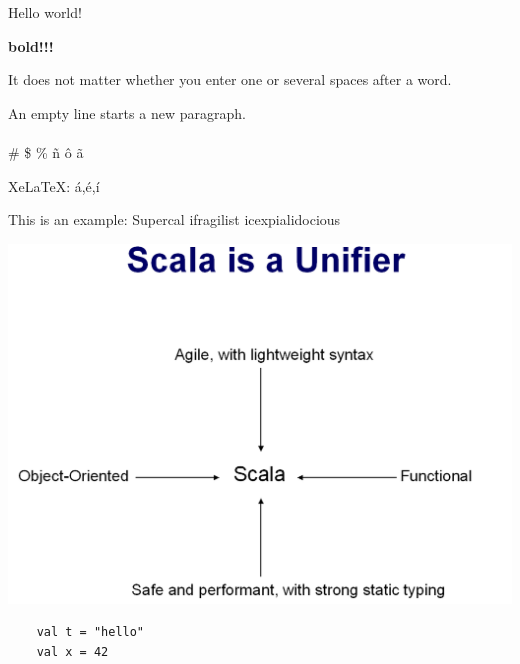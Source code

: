 \documentclass{article}
\begin{document}
Hello world!

\textbf{bold!!!}

It does not matter whether you
enter one or several             spaces
after a word.

An empty line starts a new
paragraph.
\\ \\
\# \$ \% \~n \^o \~a

XeLaTeX: á,é,í

This is an %
example: Supercal%
            ifragilist%
icexpialidocious

\includegraphics[scale=0.20]{Scala-is-a-Unifier.png}

    \begin{lstlisting}
    val t = "hello" 
    val x = 42 
    \end{lstlisting}
\end{document}
